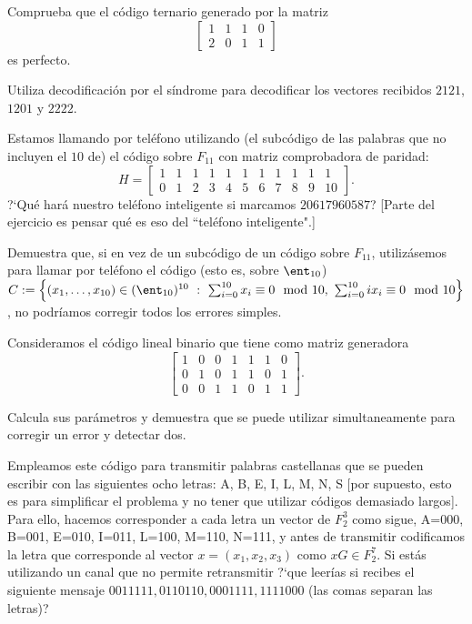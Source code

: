  \begin{problem}[2]
\ppart Comprueba que el código ternario generado por la matriz
$$\left[\begin{array}{cccc} 1&1&1&0\\2&0&1&1 \end{array}\right]$$ es
perfecto.

\ppart Utiliza decodificación por el síndrome para decodificar los
vectores recibidos $2121$, $1201$ y $2222$.

\solution
\end{problem}

\begin{problem}[3]
\ppart Estamos llamando por teléfono utilizando (el
subcódigo de las palabras que no incluyen el $10$ de) el código
sobre $ F_{11}$ con matriz comprobadora de paridad:
$$H=\left[\begin{array}{ccccccccccc}
1&1&1&1&1&1&1&1&1&1&1\\0&1&2&3&4&5&6&7&8&9&10
\end{array}\right].$$
?`Qué hará nuestro teléfono inteligente si marcamos $20617960587$?
[Parte del ejercicio es pensar qué es eso del ``teléfono
inteligente".]

\ppart Demuestra que, si en vez de un subcódigo de un código sobre
$ F_{11}$, utilizásemos para llamar por teléfono el código
 (esto es, sobre $\ent_{10}$)
$C:=\left\{(x_1,\dots,x_{10})\in(\ent_{10})^{10} \ : \
\sum_{i=0}^{10} x_i\equiv 0 \mod 10,\ \sum_{i=0}^{10} ix_i\equiv 0
\mod 10\right\}$, no podríamos corregir todos los errores
simples.

\solution
\end{problem}


\begin{problem}[4]
Consideramos el código lineal binario que tiene como matriz
generadora $$\left[\begin{array}{ccccccc}
1&0&0&1&1&1&0\\0&1&0&1&1&0&1\\0&0&1&1&0&1&1\end{array}\right].$$

\ppart Calcula sus parámetros y demuestra que se puede utilizar
simultaneamente para corregir un error y detectar dos.

\ppart Empleamos este código para transmitir palabras castellanas que
se pueden escribir con las siguientes ocho letras: A, B, E, I, L,
M, N, S [por supuesto, esto es para simplificar el problema y no
tener que utilizar códigos demasiado largos]. Para ello, hacemos
corresponder a cada letra un vector de $ F_2^3$ como sigue, A=000,
B=001, E=010, I=011, L=100, M=110, N=111, y antes de transmitir
codificamos la letra que corresponde al vector $x=(x_1,x_2,x_3)$
como $xG\in F_2^7$. Si estás utilizando un canal que no permite
retransmitir ?`que leerías si recibes el siguiente mensaje
$0011111,0110110,0001111,1111000$ (las comas separan las letras)?

\solution
\end{problem}

